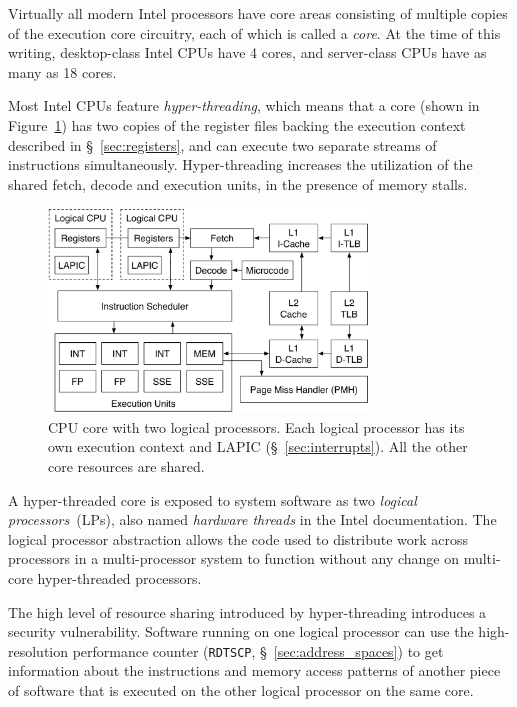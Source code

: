 Virtually all modern Intel processors have core areas consisting of multiple
copies of the execution core circuitry, each of which is called a
\textit{core}.  At the time of this writing, desktop-class Intel CPUs have 4
cores, and server-class CPUs have as many as 18 cores.

Most Intel CPUs feature \textit{hyper-threading}, which means that a core
(shown in Figure~\ref{fig:cpu_core}) has two copies of the register files
backing the execution context described in \S~\ref{sec:registers}, and can
execute two separate streams of instructions simultaneously. Hyper-threading
increases the utilization of the shared fetch, decode and execution units, in
the presence of memory stalls.

\begin{figure}[hbt]
  \centering
  \includegraphics[width=85mm]{figures/cpu_core.pdf}
  \caption{
    CPU core with two logical processors. Each logical processor has its own
    execution context and LAPIC (\S~\ref{sec:interrupts}). All the other core
    resources are shared.
  }
  \label{fig:cpu_core}
\end{figure}

A hyper-threaded core is exposed to system software as two \textit{logical
processors}~(LPs), also named \textit{hardware threads} in the Intel
documentation. The logical processor abstraction allows the code used to
distribute work across processors in a multi-processor system to function
without any change on multi-core hyper-threaded processors.

The high level of resource sharing introduced by hyper-threading introduces a
security vulnerability. Software running on one logical processor can use the
high-resolution performance counter (\texttt{RDTSCP},
\S~\ref{sec:address_spaces}) \cite{petters1999making} to get information about
the instructions and memory access patterns of another piece of software that
is executed on the other logical processor on the same core.
